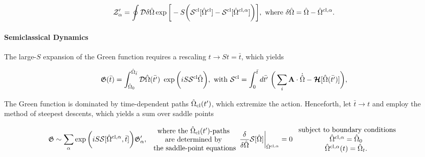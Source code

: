 \begin{equation}
    \mathcal{Z}'_{\alpha} = \oint \mathcal{D}\delta \hat{\Omega} \exp\bigg[ -S \bigg(\mathcal{S}^{\textnormal{cl}}[\hat{\Omega}^{\textnormal{cl}}] - \mathcal{S}^{\textnormal{cl}}[\hat{\Omega}^{\textnormal{cl}, \alpha}] \bigg) \bigg], \textnormal{ where } \delta \hat{\Omega} = \hat{\Omega} - \hat{\Omega}^{\textnormal{cl}, \alpha}. 
\end{equation}

\bigbreak

\paragraph{Semiclassical Dynamics}

The large-$S$ expansion of the Green function requires a rescaling $t \rightarrow St = \bar{t}$, which yields

\begin{equation}
        \mathfrak{G}(\bar{t}) = \int_{\hat{\Omega}_0}^{\hat{\Omega}_{\bar{t}}} \mathcal{D} {\hat{\Omega}}(\bar{t'}) \textnormal{ } \exp \bigg(i S \mathcal{S}^{\textnormal{cl}} {\hat{\Omega}}\bigg), \textnormal{ with } \mathcal{S}^{\textnormal{cl}} = \int_{0}^{\bar{t}} d\bar{t'} \textnormal{ } \bigg(\sum_{i} {\bf A} \cdot \dot{\hat{\Omega}} - \bm{\mathcal{H}}[{\hat{\Omega}}(\bar{t'})]\bigg),
\end{equation}

The Green function is dominated by time-dependent paths $\hat{\Omega}_{\textnormal{cl}}(t')$, which extremize the action. Henceforth, let $\bar{t} \rightarrow t$ and employ the method of steepest descents, which yields a sum over saddle points 

\begin{equation}
    \mathfrak{G} \sim \sum_{\alpha} \exp \bigg(i S \mathcal{S}[\hat{\Omega}^{\textnormal{cl}, \alpha}, \bar{t}]\bigg) \mathfrak{G}'_{\alpha}, \begin{array}{cc}
         \textnormal{ where the $\hat{\Omega}_{\textnormal{cl}}(t')$-paths } \\
         \textnormal{ are determined by } \\
         \textnormal{ the saddle-point equations} 
    \end{array} \frac{\delta}{\delta \hat{\Omega}} \mathcal{S}[\hat{\Omega}]\bigg|_{\hat{\Omega}^{\textnormal{cl}, \alpha}} = 0 \begin{array}{cc}
         \textnormal{ subject to boundary conditions}  \\
         \hat{\Omega}^{\textnormal{cl}, \alpha} = \hat{\Omega}_0 \\
         \hat{\Omega}^{\textnormal{cl}, \alpha}(t) = \hat{\Omega}_t.
    \end{array}
\end{equation}

